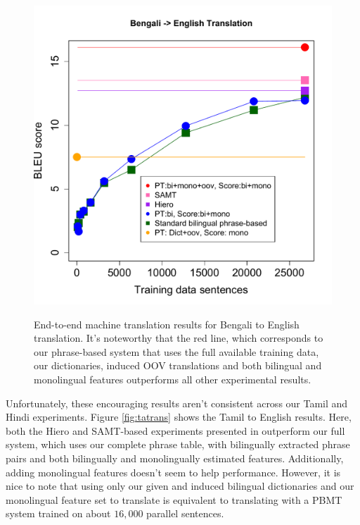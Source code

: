\documentclass[11pt]{article}
\begin{document}
\begin{figure}
\vskip 0.0in
\begin{center}
\includegraphics[width=1.05 \linewidth]{Figures/bntranslate.pdf}
\vskip -0.15in
\caption{End-to-end machine translation results for Bengali to English translation. It's noteworthy that the red line, which corresponds to our phrase-based system that uses the full available training data, our dictionaries, induced OOV translations and both bilingual and monolingual features outperforms all other experimental results.}
\vskip -0.2in
\label{fig:bntrans} 
\end{center}
\end{figure}

Unfortunately, these encouraging results aren't consistent across our Tamil and Hindi experiments. Figure \ref{fig:tatrans} shows the Tamil to English results. Here, both the Hiero and SAMT-based experiments presented in  outperform our full system, which uses our complete phrase table, with bilingually extracted phrase pairs and both bilingually and monolingually estimated features. Additionally, adding monolingual features doesn't seem to help performance. However, it is nice to note that using only our given and induced bilingual dictionaries and our monolingual feature set to translate is equivalent to translating with a PBMT system trained on about $16,000$ parallel sentences.
\end{document}
